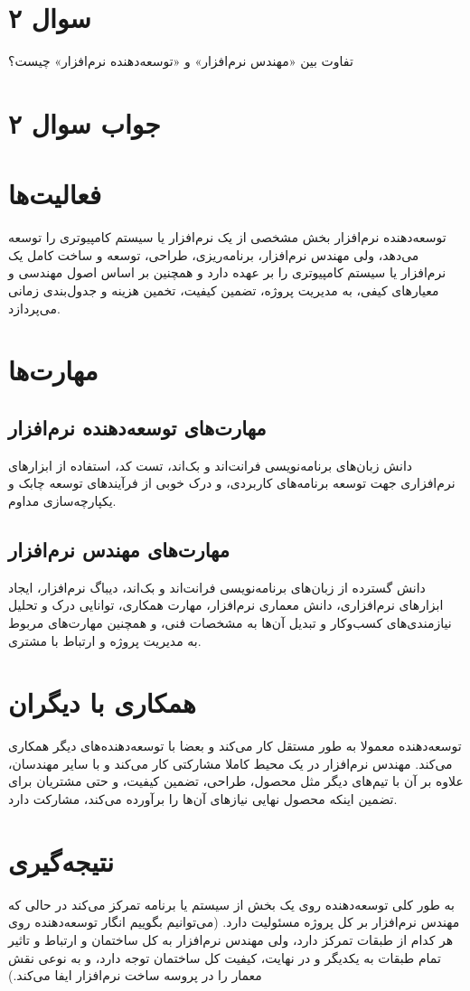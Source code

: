 \section*{سوال ۲}

تفاوت بین «مهندس نرم‌افزار» و «توسعه‌دهنده نرم‌افزار» چیست؟

\section*{جواب سوال ۲}

\section*{فعالیت‌ها}
توسعه‌دهنده نرم‌افزار بخش مشخصی از یک نرم‌افزار یا سیستم کامپیوتری را توسعه می‌دهد، ولی مهندس نرم‌افزار، برنامه‌ریزی، طراحی، توسعه و ساخت کامل یک نرم‌افزار یا سیستم کامپیوتری را بر عهده دارد و همچنین بر اساس اصول مهندسی و معیارهای کیفی، به مدیریت پروژه، تضمین کیفیت، تخمین هزینه و جدول‌بندی زمانی می‌پردازد.

\section*{مهارت‌ها}
\subsection*{مهارت‌های توسعه‌دهنده نرم‌افزار}
دانش زبان‌های برنامه‌نویسی فرانت‌اند و بک‌اند، تست کد، استفاده از ابزارهای نرم‌افزاری جهت توسعه برنامه‌های کاربردی، و درک خوبی از فرآیندهای توسعه چابک و یکپارچه‌سازی مداوم.

\subsection*{مهارت‌های مهندس نرم‌افزار}
دانش گسترده از زبان‌های برنامه‌نویسی فرانت‌اند و بک‌اند، دیباگ نرم‌افزار، ایجاد ابزارهای نرم‌افزاری، دانش معماری نرم‌افزار، مهارت همکاری، توانایی درک و تحلیل نیازمندی‌های کسب‌وکار و تبدیل آن‌ها به مشخصات فنی، و همچنین مهارت‌های مربوط به مدیریت پروژه و ارتباط با مشتری.

\section*{همکاری با دیگران}
توسعه‌دهنده معمولا به طور مستقل کار می‌کند و بعضا با توسعه‌دهنده‌های دیگر همکاری می‌کند. مهندس نرم‌افزار در یک محیط کاملا مشارکتی کار می‌کند و با سایر مهندسان، علاوه بر آن با تیم‌های دیگر مثل محصول، طراحی، تضمین کیفیت، و حتی مشتریان برای تضمین اینکه محصول نهایی نیازهای آن‌ها را برآورده می‌کند، مشارکت دارد.

\section*{نتیجه‌گیری}
به طور کلی توسعه‌دهنده روی یک بخش از سیستم یا برنامه تمرکز می‌کند در حالی که مهندس نرم‌افزار بر کل پروژه مسئولیت دارد. (می‌توانیم بگوییم انگار توسعه‌دهنده روی هر کدام از طبقات تمرکز دارد، ولی مهندس نرم‌افزار به کل ساختمان و ارتباط و تاثیر تمام طبقات به یکدیگر و در نهایت، کیفیت کل ساختمان توجه دارد، و به نوعی نقش معمار را در پروسه ساخت نرم‌افزار ایفا می‌کند.)